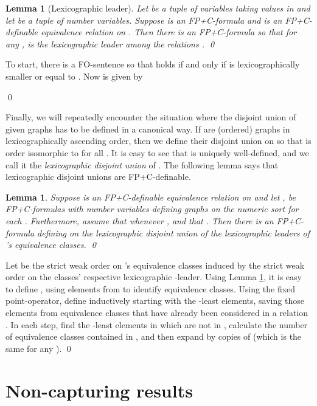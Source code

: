 \documentclass[10pt]{article}
\newtheorem{lem}[thm]{Lemma}
\theoremstyle{remark}
\theoremstyle{definition}
\theoremstyle{plain}
\newcommand{\logic}[1]{\textsf{\upshape\relsize{-0.5}#1}\xspace}
\newcommand{\FPC}{\logic{FP+C}}
\newcommand{\FOL}{\logic{FO}}
\begin{document}
\begin{lem}[Lexicographic leader] \label{lem:lexLeaderDefable}
Let  be a tuple of variables taking values in  and let  be a tuple of number variables. Suppose  is an \FPC-formula and  is an \FPC-definable equivalence relation on . Then there is an \FPC-formula  so that for any ,  is the lexicographic leader among the relations . \qed
\end{lem}

\proof To start, there is a \FOL-sentence  so that  holds if and only if  is lexicographically smaller or equal to . Now  is given by

\qed


Finally, we will repeatedly encounter the situation where the disjoint union of given graphs has to be defined in a canonical way. If  are (ordered) graphs in lexicographically ascending order, then we define their disjoint union  on  so that  is order isomorphic to  for all . It is easy to see that  is uniquely well-defined, and we call it the \emph{lexicographic disjoint union} of . The following lemma says that lexicographic disjoint unions are \FPC-definable.


\begin{lem}\label{lem:lexDisjUnionDefable}
Suppose  is an \FPC-definable equivalence relation on  and let ,  be \FPC-formulas with number variables  defining graphs  on the numeric sort for each . Furthermore, assume that  whenever , and that .  Then there is an \FPC-formula  defining on  the lexicographic disjoint union of the lexicographic leaders of 's equivalence classes. \qed
\end{lem}

\proof Let  be the strict weak order on 's equivalence classes induced by the strict weak order on the classes' respective lexicographic -leader. Using Lemma \ref{lem:lexLeaderDefable}, it is easy to define , using elements from  to identify equivalence classes. Using the fixed point-operator, define  inductively starting with the -least elements, saving those elements  from equivalence classes that have already been considered in a relation . In each step, find the -least elements  in  which are not in , calculate the number  of equivalence classes contained in , and then expand  by  copies of  (which is the same for any ). \qed



\section{Non-capturing results}\label{sec:noCaptureCompGraphs}
\end{document}
